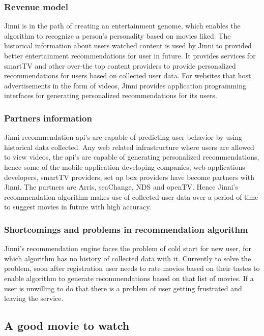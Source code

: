   \subsubsection{Revenue model}
  \label{Jinni_overview_RM}
    Jinni is in the path of creating an entertainment genome, which enables the algorithm to recognize a person's personality based on movies liked. The historical information about users watched content is used by Jinni to provided better entertainment recommendations for user in future. It provides services for smartTV and other over-the top content providers to provide personalized recommendations for users based on collected user data. For websites that host advertisements in the form of videos, Jinni provides application programming interfaces for generating personalized recommendations for its users.    
  \subsubsection{Partners information}
  \label{Jinni_overview_IP}
    Jinni recommendation api's are capable of predicting user behavior by using historical data collected. Any web related infrastructure where users are allowed to view videos, the api's are capable of generating personalized recommendations, hence some of the mobile application developing companies, web applications developers, smartTV providers, set up box providers have become partners with Jinni. The partners are Arris, seaChange, NDS and openTV. Hence Jinni's recommendation algorithm makes use of collected user data over a period of time to suggest movies in future with high accuracy. 
  \subsubsection{Shortcomings and problems in recommendation algorithm }
  \label{Jinni_overview_SP}
    Jinni's recommendation engine faces the problem of cold start for new user, for which algorithm has no history of collected data with it. Currently to solve the problem, soon after registration user needs to rate movies based on their tastes to enable algorithm to generate recommendations based on that list of movies. If a user is unwilling to do that there is a problem of user getting frustrated and leaving the service. 

  \subsection{A good movie to watch }
  \label{agoodmovietowatch_overview}
